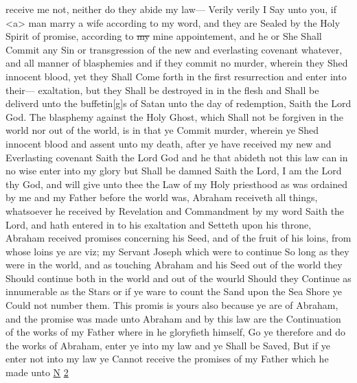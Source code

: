 receive me not, neither do they abide my law--- Verily verily I Say unto you, if <a> man marry a wife according to my word, and they are Sealed by the Holy Spirit of promise, according to \sout{my} mine appointement, and he or She Shall Commit any Sin or transgression of the new and everlasting covenant whatever, and all manner of blasphemies and if they commit no murder, wherein they Shed innocent blood, yet they Shall Come forth in the first resurrection and enter into their--- exaltation, but they Shall be destroyed in in the flesh and Shall be deliverd unto the buffetin[g]s of Satan unto the day of redemption, Saith the Lord God. The blasphemy against the Holy Ghost, which Shall not be forgiven in the world nor out of the world, is in that ye Commit murder, wherein ye Shed innocent blood and assent unto my death, after ye have received my new and Everlasting covenant Saith the Lord God and he that abideth not this law can in no wise enter into my glory but Shall be damned Saith the Lord, I am the Lord thy God, and will give unto thee the Law of my Holy priesthood as was ordained by me and my Father before the world was, Abraham receiveth all things, whatsoever he received by Revelation and Commandment by my word Saith the Lord, and hath entered in to his exaltation and Setteth upon his throne, Abraham received promises concerning his Seed, and of the fruit of his loins, from whose loins ye are viz; my Servant Joseph which were to continue So long as they were in the world, and as touching Abraham and his Seed out of the world they Should continue both in the world and out of the wourld Should they Continue as innumerable as the Stars or if ye ware to count the Sand upon the Sea Shore ye Could not number them. This promis is yours also because ye are of Abraham, and the promise was made unto Abraham and by this law are the Continuation of the works of my Father where in he gloryfieth himself, Go ye therefore and do the works of Abraham, enter ye into my law and ye Shall be Saved, But if ye enter not into my law ye Cannot receive the promises of my Father which he made unto \uline{N} \uline{2}

